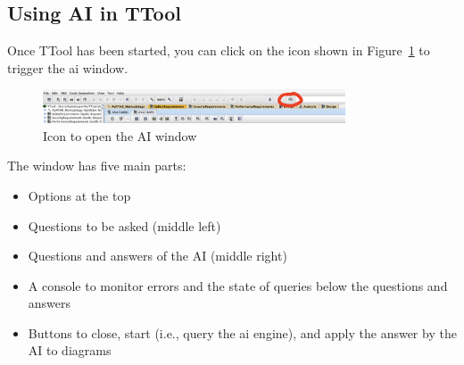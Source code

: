 \documentclass[12pt]{article}
\begin{document}
\subsection{Using AI in TTool}
Once TTool has been started, you can click on the icon shown in Figure~\ref{fig:icon} to trigger the ai window.

\begin{figure}[h!]
\centering
\includegraphics[width=0.8\textwidth]{fig/openingaiwindow.png}
\caption{Icon to open the AI window}
\label{fig:icon}
\end{figure}

The window has five main parts:
\begin{itemize}
    \item Options at the top
    \item Questions to be asked (middle left)
    \item Questions and answers of the AI (middle right)
    \item A console to monitor errors and the state of queries below the questions and answers
    \item Buttons to close, start (i.e., query the ai engine), and apply the answer by the AI to diagrams
\end{itemize}
\end{document}
